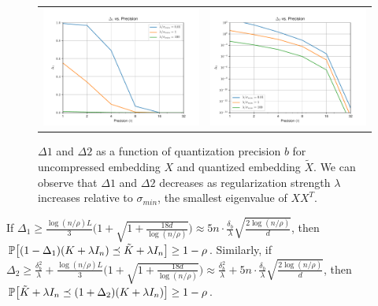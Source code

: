 \begin{figure}
	\centering	
	\begin{tabular}{c c}
		\includegraphics[width=0.45\linewidth]{figures/Delta1_vs_precision.pdf} &
		\includegraphics[width=0.45\linewidth]{figures/Delta2_vs_precision.pdf}
	\end{tabular}
	\label{fig:delta_vs_b}
	\caption{$\Delta1$ and $\Delta2$ as a function of quantization precision $b$ for uncompressed embedding $X$ and quantized embedding $\tilde{X}$. We can observe that $\Delta1$ and $\Delta2$ decreases as regularization strength $\lambda$ increases relative to $\sigma_{min}$, the smallest eigenvalue of $XX^T$.}
\end{figure}



\begin{corollary}
	\label{cor:main2}
	If $\Delta_1 \geq \frac{\log(n/\rho)L}{3}\Big(1+\sqrt{1+\frac{18d}{\log(n/\rho)}}\Big) \approx 5n\cdot \frac{\delta_b}{\lambda}\sqrt{\frac{2\log(n/\rho)}{d}}$,
	then $\Prob\big[(1 - \Delta_1) (K + \lambda I_n) \preceq \tK + \lambda I_n \big] \geq  1 - \rho$. 
	Similarly, if $\Delta_2 \geq \frac{\delta_b^2}{\lambda} +  \frac{\log(n/\rho)L}{3}\Big(1+\sqrt{1+\frac{18d}{\log(n/\rho)}}\Big) \approx \frac{\delta_b^2}{\lambda} + 5n\cdot \frac{\delta_b}{\lambda}\sqrt{\frac{2\log(n/\rho)}{d}}$,
	then $\Prob\big[\tK + \lambda I_n \preceq (1 + \Delta_2) (K + \lambda I_n)\big] \geq  1 - \rho$. 
\end{corollary}


